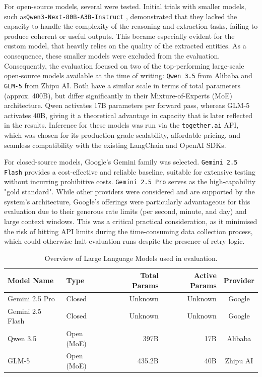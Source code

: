 For open-source models, several were tested. Initial trials with smaller models, such as\linebreak\texttt{Qwen3-Next-80B-A3B-Instruct} \cite{qwen3.5}, 
demonstrated that they lacked the capacity to handle the complexity of the reasoning and extraction tasks, failing to produce coherent or useful outputs. 
This became especially evident for the custom model, that heavily relies on the quality of the extracted entities. As a consequence, these smaller models were excluded from the evaluation.
Consequently, the evaluation focused on two of the top-performing large-scale open-source models available at the time of writing: \texttt{Qwen 3.5} 
from Alibaba and \texttt{GLM-5} from Zhipu AI. Both have a similar scale in terms of total parameters (approx. 400B), 
but differ significantly in their Mixture-of-Experts (MoE) architecture. Qwen activates 17B parameters per forward pass, 
whereas GLM-5 activates 40B, giving it a theoretical advantage in capacity that is later reflected in the results. 
Inference for these models was run via the \texttt{together.ai} \cite{togetherai} API, which was chosen for its production-grade scalability, affordable pricing, and seamless compatibility with the existing LangChain and OpenAI SDKs.

For closed-source models, Google's Gemini family was selected. \texttt{Gemini 2.5 Flash} provides a cost-effective and reliable baseline, 
suitable for extensive testing without incurring prohibitive costs. \texttt{Gemini 2.5 Pro} serves as the high-capability "gold standard".
While other providers were considered and are supported by the system's architecture, 
Google's offerings were particularly advantageous for this evaluation due to their generous rate limits (per second, minute, and day) and large context windows. 
This was a critical practical consideration, as it minimised the risk of hitting API limits during the time-consuming data collection process, 
which could otherwise halt evaluation runs despite the presence of retry logic.

\begin{table}[h!]
    \centering
    \caption{Overview of Large Language Models used in evaluation.}
    \label{tab:model_config}
    \begin{tabular}{l l r r c}
        \hline
        \textbf{Model Name} & \textbf{Type} & \textbf{Total Params} & \textbf{Active Params} & \textbf{Provider} \\
        \hline
        Gemini 2.5 Pro \cite{geminiteam2025geminifamilyhighlycapable} & Closed & Unknown & Unknown & Google \\
        Gemini 2.5 Flash \cite{geminiteam2025geminifamilyhighlycapable} & Closed & Unknown & Unknown & Google \\
        Qwen 3.5 \cite{qwen3technicalreport} & Open (MoE) & 397B & 17B & Alibaba  \\
        GLM-5 \cite{glm5team2026glm5vibecodingagentic}  & Open (MoE) & 435.2B & 40B & Zhipu AI \\
        \hline
    \end{tabular}
\end{table}

